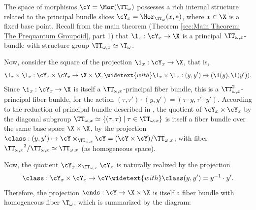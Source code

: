   
  \begin{article}
    \label{art: Structure of the Space of Morphisms}
    
    The space of morphisms $\cY = \Mor(\TT_\omega)$ possesses a rich internal structure related to the principal bundle slices $\cY_x = \Mor_{\TT_\omega}(x, \ast)$,
    where $x \in \X$ is a fixed base point.
    Recall from the main theorem (Theorem \ref{sec:Main Theorem: The Prequantum Groupoid}, part 1) that $\1_x: \cY_x \to \X$ is a principal $\TT_{\omega,x}$-bundle with structure group $\TT_{\omega,x} \simeq \T_\omega$.
    
    Now,
    consider the square of the projection $\1_x : \cY_x \to \X$,
    that is,
    $$
      \1_x \times \1_x : \cY_x \times \cY_x \to \X \times \X,
      \widetext{with}
      \1_x \times \1_x  : (y,y') \mapsto (\1(y),\1(y')).
      $$
    Since $\1_x : \cY_x \to \X$ is itself a $\TT_{\omega,x}$-principal fiber bundle,
    this is a $\TT_{\omega,x}^2$-principal fiber bunlde,
    for the action $(\tau,\tau') \cdot (y,y') = (\tau \cdot y, \tau' \cdot y')$.
    According to the reduction of principal bundle described in \cite[]{PIZ13},
    the quotient of $\cY_x \times \cY_x$ by the diagonal subgroup $\TT_{\omega,x} \simeq \{(\tau,\tau) \mid \tau \in \TT_{\omega,x} \}$ is itself a fiber bundle over the same base space $\X \times \X$,
    by the projection $\class: (y,y') \mapsto \cY \times_{\TT_{\omega,x}} \cY = (\cY \times \cY)/{\TT_{\omega,x}}$,
    with fiber ${\TT_{\omega,x}}^2/{\TT_{\omega,x}} \simeq {\TT_{\omega,x}}$ (as homogeneous space).
    
    Now,
    the quotient $\cY_x \times_{\TT_{\omega,x}} \cY_x$ is naturally realized by the projection
    $$
      \class:  \cY_x \times \cY_x \to \cY
      \widetext{with}
      \class(y,y') = y^{-1} \cdot y'.
      $$
    Therefore,
    the projection $\ends: \cY \to \X \times \X$ is itself a fiber bundle with homogeneous fiber $\T_\omega$,
    which is summarized by the diagram:
    
    \begin{center}
    \end{center}
    

\end{article}

